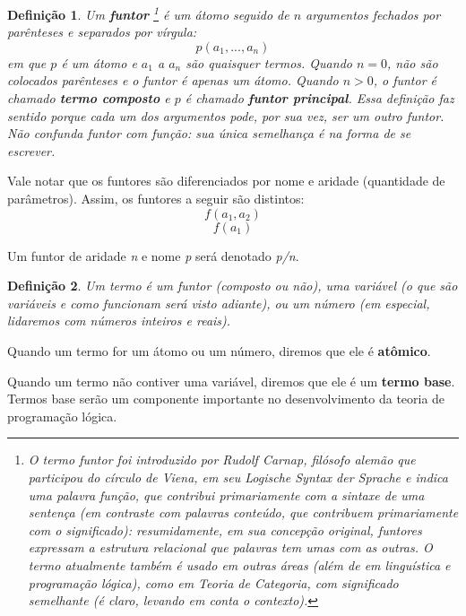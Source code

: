 \documentclass{article}
\newtheorem{definition}{Definição}[section]
\theoremstyle{remark}
\begin{document}
  \theoremstyle{definition}
  \begin{definition} Um \textbf{funtor}
    \footnote{ O termo \textit{funtor} foi introduzido por Rudolf Carnap, filósofo alemão que participou do círculo de Viena, em seu \textit{Logische Syntax der Sprache}\cite{carnap} e indica uma \textit{palavra função}, que contribui primariamente com a sintaxe de uma sentença (em contraste com \textit{palavras conteúdo}, que contribuem primariamente com o significado): resumidamente, em sua concepção original, funtores expressam a estrutura relacional que palavras tem umas com as outras. O termo atualmente também é usado em outras áreas (além de em linguística e programação lógica), como em \textit{Teoria de Categoria}, com   significado semelhante (é claro, levando em conta o contexto).  }
    é um átomo seguido de $n$ argumentos fechados por parênteses e separados por vírgula:
    \[
      p(a_1, ..., a_n)
    \]
\noindent em que $p$ é um átomo e $a_1$ a $a_n$ são quaisquer termos. Quando $n = 0$, não são colocados parênteses e o funtor é apenas um átomo. Quando $n > 0$, o funtor é chamado \textbf{termo composto} e $p$ é chamado \textbf{funtor principal}. Essa definição faz sentido porque cada um dos argumentos pode, por sua vez, ser um outro funtor.
  Não confunda funtor com função: sua única semelhança é na forma de se escrever.
  \end{definition}
Vale notar que os funtores são diferenciados por nome e aridade (quantidade de parâmetros). Assim, os funtores a seguir são distintos:
    \[
      f(a_1, a_2)
    \]
    \[
      f(a_1)
    \]

    Um funtor de aridade \textit{n} e nome \textit{p} será denotado \textit{p/n}.



  \theoremstyle{definition}
  \begin{definition} Um termo é um funtor (composto ou não), uma variável (o que são variáveis e como funcionam será visto adiante), ou um número (em especial, lidaremos com números inteiros e reais).
  \end{definition}

  Quando um termo for um átomo ou um número, diremos que ele é \textbf{atômico}.

Quando um termo não contiver uma variável, diremos que ele é um \textbf{termo base}.
Termos base serão um componente importante no desenvolvimento da teoria de programação lógica.
\end{document}
